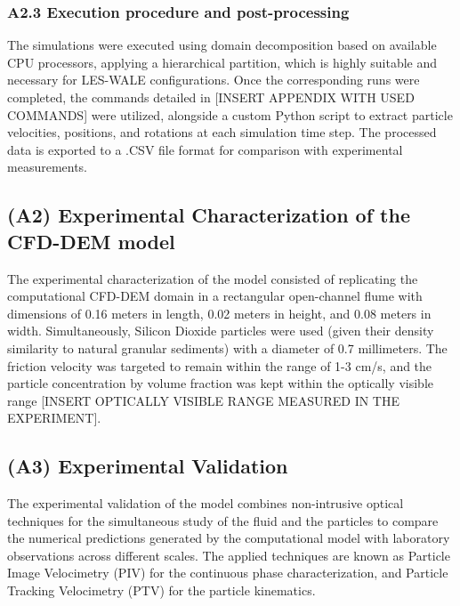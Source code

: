 \subsubsection{A2.3 Execution procedure and post-processing}

The simulations were executed using domain decomposition based on available CPU processors, applying a hierarchical partition, which is highly suitable and necessary for LES-WALE configurations. Once the corresponding runs were completed, the commands detailed in {[}INSERT APPENDIX WITH USED COMMANDS{]} were utilized, alongside a custom Python script to extract particle velocities, positions, and rotations at each simulation time step. The processed data is exported to a .CSV file format for comparison with experimental measurements.

\hypertarget{a2-experimental-characterization-of-the-cfd-dem-model}{%
\subsection{\texorpdfstring{(A2) Experimental Characterization of the CFD-DEM model }{(A2) Experimental Characterization of the CFD-DEM model }}\label{a2-experimental-characterization-of-the-cfd-dem-model}}

The experimental characterization of the model consisted of replicating the computational CFD-DEM domain in a rectangular open-channel flume with dimensions of 0.16 meters in length, 0.02 meters in height, and 0.08 meters in width. Simultaneously, Silicon Dioxide particles were used (given their density similarity to natural granular sediments) with a diameter of 0.7 millimeters. The friction velocity was targeted to remain within the range of 1-3 cm/s, and the particle concentration by volume fraction was kept within the optically visible range {[}INSERT OPTICALLY VISIBLE RANGE MEASURED IN THE EXPERIMENT{]}.

\hypertarget{a3-experimental-validation}{%
\subsection{(A3) Experimental Validation}\label{a3-experimental-validation}}

The experimental validation of the model combines non-intrusive optical techniques for the simultaneous study of the fluid and the particles to compare the numerical predictions generated by the computational model with laboratory observations across different scales. The applied techniques are known as Particle Image Velocimetry (PIV) for the continuous phase characterization, and Particle Tracking Velocimetry (PTV) for the particle kinematics.

